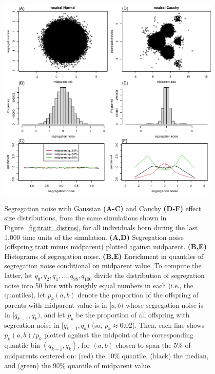 \documentclass{article}
\theoremstyle{remark}
\theoremstyle{definition}
\begin{document}
\begin{figure}
    \begin{center}
        \includegraphics{sims/neutral_seg_noise}
    \end{center}
    Segregation noise with Gaussian \textbf{(A-C)} and Cauchy \textbf{(D-F)} effect size distributions,
    from the same simulations shown in Figure~\ref{fig:trait_distrns},
    for all individuals born during the last 1,000 time units of the simulation.
    \textbf{(A,D)} Segregation noise (offspring trait minus midparent) plotted against midparent.
    \textbf{(B,E)} Histograms of segregation noise.
    \textbf{(B,E)} Enrichment in quantiles of segregation noise conditional on midparent value.
    To compute the latter,
    let $q_0, q_2, q_4, \ldots, q_{98}, q_{100}$ divide the distribution of segregation noise
    into 50 bins with roughly equal numbers in each (i.e., the quantiles),
    let $p_k(a,b)$ denote the proportion of the offspring of parents with midparent value
    is in $[a, b)$ whose segregation noise is in $[q_{k-1}, q_k)$,
    and let $p_k$ be the proportion of all offspring with segreation noise in $[q_{k-1}, q_k)$
    (so, $p_k \approx 0.02$).
    Then, each line shows $p_k(a,b)/p_k$
    plotted against the midpoint of the corresponding quantile bin $(q_{k-1},q_k)$,
    for $(a,b)$ chosen to span the 5\% of midparents centered on:
    (red) the 10\% quantile,
    (black) the median, and
    (green) the 90\% quantile of midparent value.
    \caption{
        \label{fig:seg_noise}
    }
\end{figure}
\end{document}

